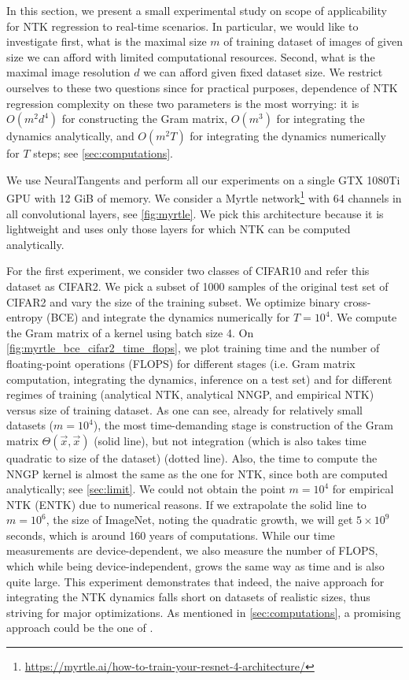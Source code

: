 \documentclass{article}
\begin{document}
    In this section, we present a small experimental study on scope of applicability for NTK regression to real-time scenarios.
    In particular, we would like to investigate first, what is the maximal size $m$ of training dataset of images of given size we can afford with limited computational resources.
    Second, what is the maximal image resolution $d$ we can afford given fixed dataset size.
    We restrict ourselves to these two questions since for practical purposes, dependence of NTK regression complexity on these two parameters is the most worrying: it is $O(m^2 d^4)$ for constructing the Gram matrix, $O(m^3)$ for integrating the dynamics analytically, and $O(m^2 T)$ for integrating the dynamics numerically for $T$ steps; see \cref{sec:computations}.

    We use NeuralTangents \cite{novak2019neural} and perform all our experiments on a single GTX 1080Ti GPU with 12 GiB of memory.
    We consider a Myrtle network\footnote{\url{https://myrtle.ai/how-to-train-your-resnet-4-architecture/}} with 64 channels in all convolutional layers, see \cref{fig:myrtle}.
    We pick this architecture because it is lightweight and uses only those layers for which NTK can be computed analytically.

    For the first experiment, we consider two classes of CIFAR10 and refer this dataset as CIFAR2.
    We pick a subset of 1000 samples of the original test set of CIFAR2 and vary the size of the training subset.
    We optimize binary cross-entropy (BCE) and integrate the dynamics numerically for $T = 10^4$.
    We compute the Gram matrix of a kernel using batch size 4.
    On \cref{fig:myrtle_bce_cifar2_time_flops}, we plot training time and the number of floating-point operations (FLOPS) for different stages (i.e. Gram matrix computation, integrating the dynamics, inference on a test set) and for different regimes of training (analytical NTK, analytical NNGP, and empirical NTK) versus size of training dataset.
    As one can see, already for relatively small datasets ($m=10^4$), the most time-demanding stage is construction of the Gram matrix $\Theta(\vec x, \vec x)$ (solid line), but not integration (which is also takes time quadratic to size of the dataset) (dotted line).
    Also, the time to compute the NNGP kernel is almost the same as the one for NTK, since both are computed analytically; see \cref{sec:limit}.
    We could not obtain the point $m=10^4$ for empirical NTK (ENTK) due to numerical reasons.
    If we extrapolate the solid line to $m=10^6$, the size of ImageNet, noting the quadratic growth, we will get $5 \times 10^9$ seconds, which is around 160 years of computations.
    While our time measurements are device-dependent, we also measure the number of FLOPS, which while being device-independent, grows the same way as time and is also quite large.
    This experiment demonstrates that indeed, the naive approach for integrating the NTK dynamics falls short on datasets of realistic sizes, thus striving for major optimizations.
    As mentioned in \cref{sec:computations}, a promising approach could be the one of \cite{meanti2020kernel}.
\end{document}
